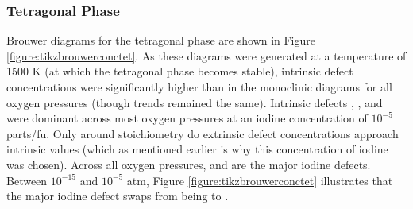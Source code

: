 
\subsubsection*{Tetragonal Phase}

Brouwer diagrams for the tetragonal phase are shown in Figure \ref{figure:tikzbrouwerconctet}. As these diagrams were generated at a temperature of 1500 K (at which the tetragonal phase becomes stable), intrinsic defect concentrations were significantly higher than in the monoclinic diagrams for all oxygen pressures (though trends remained the same). Intrinsic defects , ,  and  were dominant across most oxygen pressures at an iodine concentration of $10^{-5}$ parts/fu. Only around stoichiometry do extrinsic defect concentrations approach intrinsic values (which as mentioned earlier is why this concentration of iodine was chosen). Across all oxygen pressures,  and  are the major iodine defects. Between $10^{-15}$ and $10^{-5}$ atm, Figure \ref{figure:tikzbrouwerconctet} illustrates that the major iodine defect swaps from being  to . 

